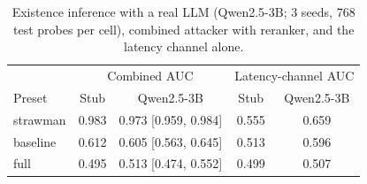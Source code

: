 \begin{table}[tbp]
\centering
\small
\setlength{\tabcolsep}{4pt}
\caption{Existence inference with a real LLM (Qwen2.5-3B; 3 seeds, 768 test probes per cell),
combined attacker with reranker, and the latency channel alone.}
\label{tab:realllm-eia}
\begin{tabular}{lcccc}
\toprule
 & \multicolumn{2}{c}{Combined AUC} & \multicolumn{2}{c}{Latency-channel AUC} \\
Preset & Stub & Qwen2.5-3B & Stub & Qwen2.5-3B \\
\midrule
strawman & 0.983 & 0.973 [0.959, 0.984] & 0.555 & 0.659 \\
baseline & 0.612 & 0.605 [0.563, 0.645] & 0.513 & 0.596 \\
full & 0.495 & 0.513 [0.474, 0.552] & 0.499 & 0.507 \\
\bottomrule
\end{tabular}
\end{table}
